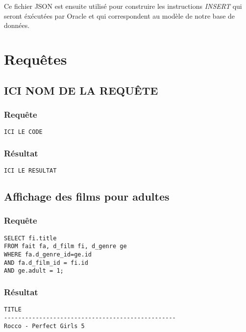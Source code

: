 Ce fichier JSON est ensuite utilisé pour construire les instructions \emph{INSERT} qui seront éxécutées par Oracle et qui correspondent au modèle de notre base de données.

\section{Requêtes}

\subsection{ICI NOM DE LA REQUÊTE}
\subsubsection{Requête}
\begin{lstlisting}
ICI LE CODE
\end{lstlisting}
\subsubsection{Résultat}
\begin{lstlisting}
ICI LE RESULTAT
\end{lstlisting}

\subsection{Affichage des films pour adultes}
\subsubsection{Requête}
\begin{lstlisting}
SELECT fi.title
FROM fait fa, d_film fi, d_genre ge
WHERE fa.d_genre_id=ge.id
AND fa.d_film_id = fi.id
AND ge.adult = 1;
\end{lstlisting}
\subsubsection{Résultat}
\begin{lstlisting}
TITLE
-------------------------------------------------
Rocco - Perfect Girls 5
\end{lstlisting}
